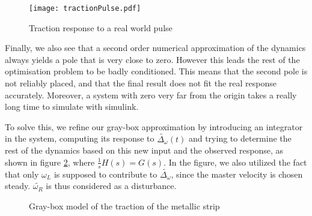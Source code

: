 \begin{figure}[htbp]
\centering
\texttt{[image: tractionPulse.pdf]}
\caption{Traction response to a real world pulse\label{fig:tracImpulseResponse}}
\end{figure}

Finally, we also see that a second order numerical approximation of the dynamics always yields a pole that is very close to zero. However this leads the rest of the optimisation problem to be badly conditioned. This means that the second pole is not reliably placed, and that the final result does not fit the real response accurately. Moreover, a system with zero very far from the origin takes a really long time to simulate with simulink.

To solve this, we refine our gray-box approximation by introducing an integrator in the system, computing its response to $\tilde{\Delta_\omega}(t)$ and trying to determine the rest of the dynamics based on this new input and the observed response, as shown in figure \ref{fig:tractionGrayBox}, where $\frac{1}{s}H(s) = G(s)$. In the figure, we also utilized the fact that only $\omega_L$ is supposed to contribute to $\tilde{\Delta_\omega}$, since the master velocity is chosen steady. $\tilde{\omega_R}$ is thus considered as a disturbance.
\begin{figure}[htbp]
\centering
{}
\caption{\label{fig:tractionInput}Gray-box model of the traction of the metallic strip\label{fig:tractionGrayBox}}
\end{figure}

